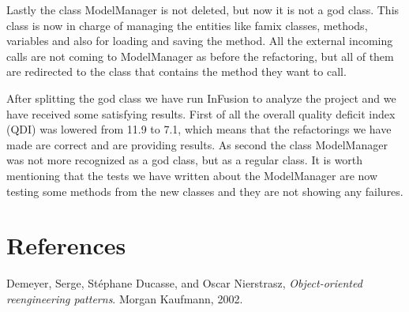 \documentclass{article}
\begin{document}
Lastly the class ModelManager is not deleted, but now it is not a god class. This class is now in charge of managing the entities like famix classes, methods, variables and also for loading and saving the method. All the external incoming calls are not coming to ModelManager as before the refactoring, but all of them are redirected to the class that contains the method they want to call.

After splitting the god class we have run InFusion to analyze the project and we have received some satisfying results. First of all the overall quality deficit index (QDI) was lowered from 11.9 to 7.1, which means that the refactorings we have made are correct and are providing results. As second the class ModelManager was not more recognized as a god class, but as a regular class. It is worth mentioning that the tests we have written about the ModelManager are now testing some methods from the new classes and they are not showing any failures.

\newpage
\section{References}
\begin{thebibliography}{9}

	Demeyer, Serge, St{\'e}phane Ducasse, and Oscar Nierstrasz,
	\emph{Object-oriented reengineering patterns}. 
	Morgan Kaufmann, 
	2002.

\end{thebibliography}
\end{document}
